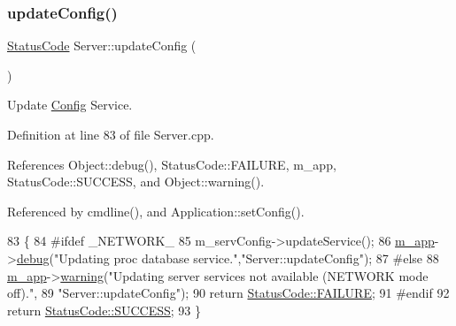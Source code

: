 \mbox{\label{classServer_af58d60a5587813e2aab7fc9016dfa01a}} 
\subsubsection{\texorpdfstring{update\+Config()}{updateConfig()}}
{\footnotesize\ttfamily \hyperlink{classStatusCode}{Status\+Code} Server\+::update\+Config (\begin{DoxyParamCaption}{ }\end{DoxyParamCaption})}



Update \hyperlink{classConfig}{Config} Service. 



Definition at line 83 of file Server.\+cpp.



References Object\+::debug(), Status\+Code\+::\+F\+A\+I\+L\+U\+RE, m\+\_\+app, Status\+Code\+::\+S\+U\+C\+C\+E\+SS, and Object\+::warning().



Referenced by cmdline(), and Application\+::set\+Config().


\begin{DoxyCode}
83                                   \{
84 \textcolor{preprocessor}{#ifdef \_NETWORK\_}
85   m\_servConfig->updateService();
86   \hyperlink{classServer_ae1c25dc357c4a1145289c747fddaa251}{m\_app}->\hyperlink{classObject_aac010553f022165573714b7014a15f0d}{debug}(\textcolor{stringliteral}{"Updating proc database service."},\textcolor{stringliteral}{"Server::updateConfig"});
87 \textcolor{preprocessor}{#else}
88   \hyperlink{classServer_ae1c25dc357c4a1145289c747fddaa251}{m\_app}->\hyperlink{classObject_a65cd4fda577711660821fd2cd5a3b4c9}{warning}(\textcolor{stringliteral}{"Updating server services not available (NETWORK mode off)."},
89                  \textcolor{stringliteral}{"Server::updateConfig"}); 
90   \textcolor{keywordflow}{return} \hyperlink{classStatusCode_a6f565cbeadc76d14c72f047e5e85eb4ba3da73d4c469762eb9d3c960368252b26}{StatusCode::FAILURE};
91 \textcolor{preprocessor}{#endif}
92   \textcolor{keywordflow}{return} \hyperlink{classStatusCode_a6f565cbeadc76d14c72f047e5e85eb4badd0da38d3ba0d922efd1f4619bc37ad8}{StatusCode::SUCCESS};
93 \}
\end{DoxyCode}
\mbox{\label{classServer_ac3b91a1bf06dab7911e6d1b867d677bc}} 

